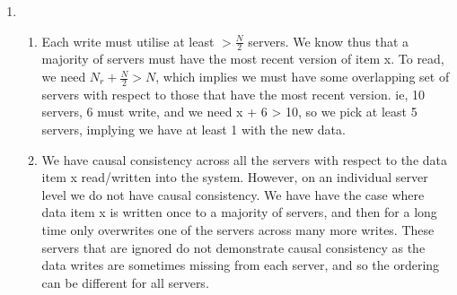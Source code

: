 \documentclass{article}
\begin{document}
\begin{enumerate}
\begin{enumerate}
	\end{enumerate}

	\item  

	\begin{enumerate}

		\item 
Each write must utilise at least \( > \frac{N}{2}\) servers. We know thus that a majority of servers must have the most recent version of item x. To read, we need \( N_r + \frac{N}{2} > N \), which implies we must have some overlapping set of servers with respect to those that have the most recent version. ie, 10 servers, 6 must write, and we need x + 6 > 10, so we pick at least 5 servers, implying we have at least 1 with the new data.

		\item 
We have causal consistency across all the servers with respect to the data item x read/written into the system. However, on an individual server level we do not have causal consistency. We have have the case where data item x is written once to a majority of servers, and then for a long time only overwrites one of the servers across many more writes. These servers that are ignored do not demonstrate causal consistency as the data writes are sometimes missing from each server, and so the ordering can be different for all servers.

	\end{enumerate}

\end{enumerate}
\end{document}
